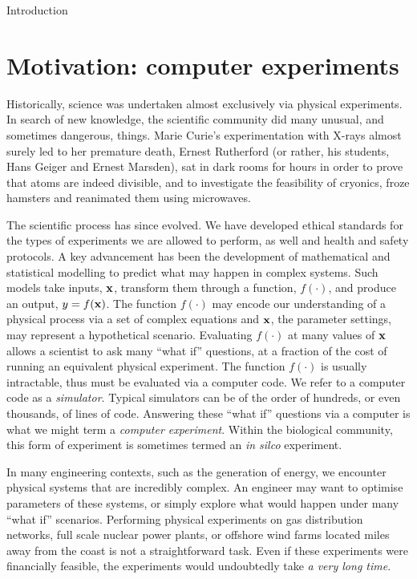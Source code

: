 \begin{chapter}{Introduction \label{Ch:Intro}}
\section{Motivation: computer experiments}
Historically, science was undertaken almost exclusively via physical experiments. In search of new knowledge, the scientific community did many unusual, and sometimes dangerous, things. Marie Curie's experimentation with X-rays almost surely led to her premature death, Ernest Rutherford (or rather, his students, Hans Geiger and Ernest Marsden), sat in dark rooms for hours in order to prove that atoms are indeed divisible, and to investigate the feasibility of cryonics, \citet{Smith1954} froze hamsters and reanimated them using microwaves.

The scientific process has since evolved. We have developed ethical standards for the types of experiments we are allowed to perform, as well and health and safety protocols. A key advancement has been the development of mathematical and statistical modelling to predict what may happen in complex systems. Such models take inputs, $\mathbf{x}$, transform them through a function, $f(\cdot)$, and produce an output, $y = f(\mathbf{x})$. The function $f(\cdot)$ may encode our understanding of a physical process via a set of complex equations and $\mathbf{x}$, the parameter settings, may represent a hypothetical scenario. Evaluating $f(\cdot)$ at many values of $\mathbf{x}$ allows a scientist to ask many ``what if'' questions, at a fraction of the cost of running an equivalent physical experiment. The function $f(\cdot)$ is usually intractable, thus must be evaluated via a computer code. We refer to a computer code as a \textit{simulator}. Typical simulators can be of the order of hundreds, or even thousands, of lines of code. Answering these ``what if'' questions via a computer is what we might term a \textit{computer experiment}. Within the biological community, this form of experiment is sometimes termed an \textit{in silco} experiment.

In many engineering contexts, such as the generation of energy, we encounter physical systems that are incredibly complex. An engineer may want to optimise parameters of these systems, or simply explore what would happen under many ``what if'' scenarios. Performing physical experiments on gas distribution networks, full scale nuclear power plants, or offshore wind farms located miles away from the coast is not a straightforward task. Even if these experiments were financially feasible, the experiments would undoubtedly take \textit{a very long time}.


\end{chapter}
